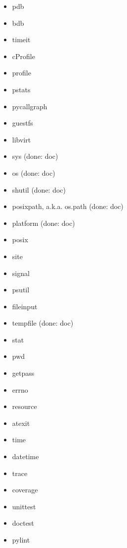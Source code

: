 \documentclass{article}
\begin{document}
\begin{enumerate}
\begin{itemize}
            \item pdb
            \item bdb
            \item timeit
            \item cProfile
            \item profile
            \item pstats
            \item pycallgraph

            \item guestfs
            \item libvirt

            \item sys (done: doc)
            \item os (done: doc)
            \item shutil (done: doc)
            \item posixpath, a.k.a. os.path (done: doc)
            \item platform (done: doc)
            \item posix
            \item site
            \item signal
            \item psutil
            \item fileinput
            \item tempfile (done: doc)
            \item stat
            \item pwd
            \item getpass
            \item errno
            \item resource
            \item atexit

            \item time
            \item datetime

            \item trace
            \item coverage
            \item unittest
            \item doctest

            \item pylint


\end{itemize}
\end{enumerate}
\end{document}
